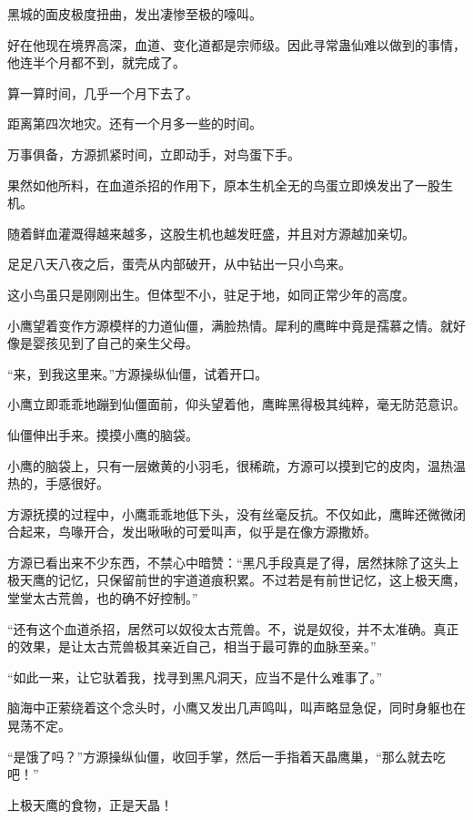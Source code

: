 
\begin{this_body}

黑城的面皮极度扭曲，发出凄惨至极的嚎叫。

好在他现在境界高深，血道、变化道都是宗师级。因此寻常蛊仙难以做到的事情，他连半个月都不到，就完成了。

算一算时间，几乎一个月下去了。

距离第四次地灾。还有一个月多一些的时间。

万事俱备，方源抓紧时间，立即动手，对鸟蛋下手。

果然如他所料，在血道杀招的作用下，原本生机全无的鸟蛋立即焕发出了一股生机。

随着鲜血灌溉得越来越多，这股生机也越发旺盛，并且对方源越加亲切。

足足八天八夜之后，蛋壳从内部破开，从中钻出一只小鸟来。

这小鸟虽只是刚刚出生。但体型不小，驻足于地，如同正常少年的高度。

小鹰望着变作方源模样的力道仙僵，满脸热情。犀利的鹰眸中竟是孺慕之情。就好像是婴孩见到了自己的亲生父母。

“来，到我这里来。”方源操纵仙僵，试着开口。

小鹰立即乖乖地蹦到仙僵面前，仰头望着他，鹰眸黑得极其纯粹，毫无防范意识。

仙僵伸出手来。摸摸小鹰的脑袋。

小鹰的脑袋上，只有一层嫩黄的小羽毛，很稀疏，方源可以摸到它的皮肉，温热温热的，手感很好。

方源抚摸的过程中，小鹰乖乖地低下头，没有丝毫反抗。不仅如此，鹰眸还微微闭合起来，鸟喙开合，发出啾啾的可爱叫声，似乎是在像方源撒娇。

方源已看出来不少东西，不禁心中暗赞：“黑凡手段真是了得，居然抹除了这头上极天鹰的记忆，只保留前世的宇道道痕积累。不过若是有前世记忆，这上极天鹰，堂堂太古荒兽，也的确不好控制。”

“还有这个血道杀招，居然可以奴役太古荒兽。不，说是奴役，并不太准确。真正的效果，是让太古荒兽极其亲近自己，相当于最可靠的血脉至亲。”

“如此一来，让它驮着我，找寻到黑凡洞天，应当不是什么难事了。”

脑海中正萦绕着这个念头时，小鹰又发出几声鸣叫，叫声略显急促，同时身躯也在晃荡不定。

“是饿了吗？”方源操纵仙僵，收回手掌，然后一手指着天晶鹰巢，“那么就去吃吧！”

上极天鹰的食物，正是天晶！


\end{this_body}

